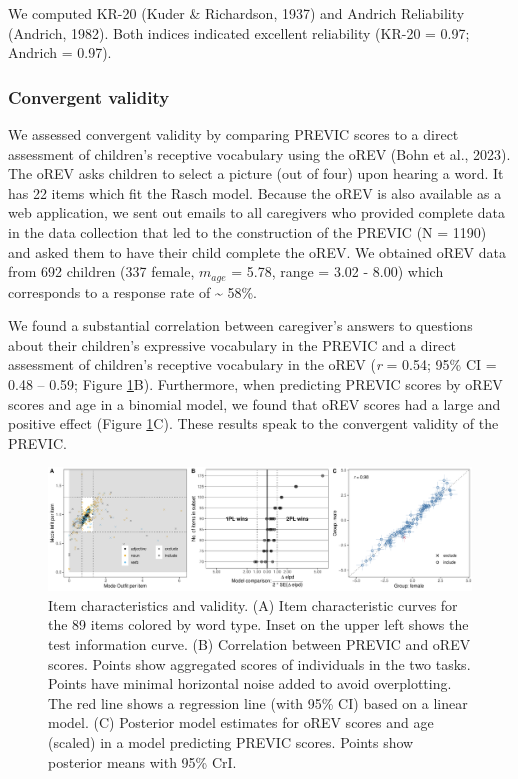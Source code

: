 \documentclass[
  man,floatsintext]{apa6}
\begin{document}
We computed KR-20 (Kuder \& Richardson, 1937) and Andrich Reliability (Andrich, 1982). Both indices indicated excellent reliability (KR-20 = 0.97; Andrich = 0.97).

\hypertarget{convergent-validity}{%
\subsubsection{Convergent validity}\label{convergent-validity}}

We assessed convergent validity by comparing PREVIC scores to a direct assessment of children's receptive vocabulary using the oREV (Bohn et al., 2023). The oREV asks children to select a picture (out of four) upon hearing a word. It has 22 items which fit the Rasch model. Because the oREV is also available as a web application, we sent out emails to all caregivers who provided complete data in the data collection that led to the construction of the PREVIC (N = 1190) and asked them to have their child complete the oREV. We obtained oREV data from 692 children (337 female, \(m_{age}\) = 5.78, range = 3.02 - 8.00) which corresponds to a response rate of \textasciitilde{} 58\%.

We found a substantial correlation between caregiver's answers to questions about their children's expressive vocabulary in the PREVIC and a direct assessment of children's receptive vocabulary in the oREV (\emph{r} = 0.54; 95\% CI = 0.48 -- 0.59; Figure \ref{fig:fig4}B). Furthermore, when predicting PREVIC scores by oREV scores and age in a binomial model, we found that oREV scores had a large and positive effect (Figure \ref{fig:fig4}C). These results speak to the convergent validity of the PREVIC.



\begin{figure}

{\centering \includegraphics[width=1\linewidth]{../graphs/fig4} 

}

\caption{Item characteristics and validity. (A) Item characteristic curves for the 89 items colored by word type. Inset on the upper left shows the test information curve. (B) Correlation between PREVIC and oREV scores. Points show aggregated scores of individuals in the two tasks. Points have minimal horizontal noise added to avoid overplotting. The red line shows a regression line (with 95\% CI) based on a linear model. (C) Posterior model estimates for oREV scores and age (scaled) in a model predicting PREVIC scores. Points show posterior means with 95\% CrI.}\label{fig:fig4}
\end{figure}
\end{document}
